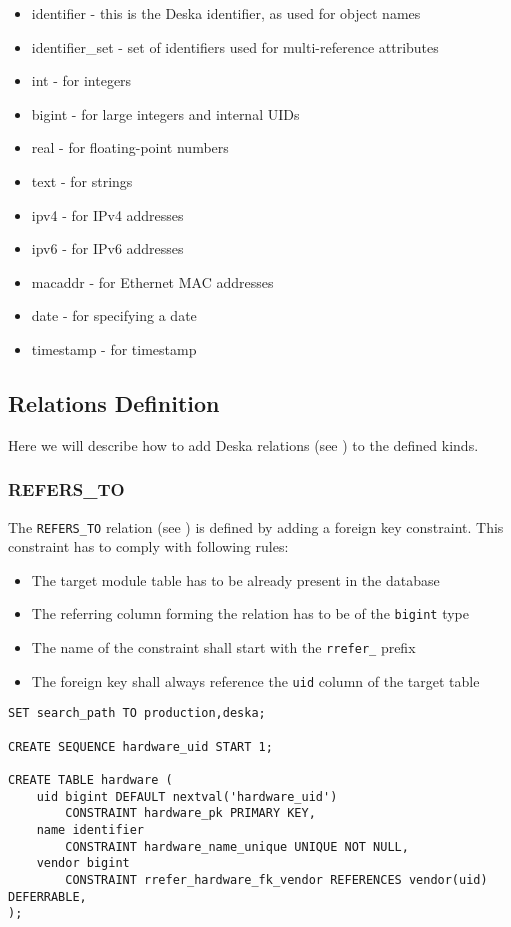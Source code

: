 \documentclass[deska]{subfiles}
\begin{document}
\begin{itemize}
	\item{identifier} - this is the Deska identifier, as used for object names
	\item{identifier\_set} - set of identifiers used for multi-reference attributes
	\item{int} - for integers
	\item{bigint} - for large integers and internal UIDs
	\item{real} - for floating-point numbers
	\item{text} - for strings
	\item{ipv4} - for IPv4 addresses
	\item{ipv6} - for IPv6 addresses
	\item{macaddr} - for Ethernet MAC addresses
	\item{date} - for specifying a date
	\item{timestamp} - for timestamp
\end{itemize}

\subsection{Relations Definition}
Here we will describe how to add Deska relations (see ) to the defined kinds.

\subsubsection{REFERS\_TO}
\label{sec:db-scheme-refers-to}

The {\tt REFERS\_TO} relation (see ) is defined by adding a foreign key constraint. This
constraint has to comply with following rules:

\begin{itemize}
    \item The target module table has to be already present in the database
    \item The referring column forming the relation has to be of the {\tt bigint} type
    \item The name of the constraint shall start with the {\tt rrefer\_} prefix
    \item The foreign key shall always reference the {\tt uid} column of the target table
\end{itemize}

\begin{verbatim}
SET search_path TO production,deska;

CREATE SEQUENCE hardware_uid START 1;

CREATE TABLE hardware (
    uid bigint DEFAULT nextval('hardware_uid')
        CONSTRAINT hardware_pk PRIMARY KEY,
    name identifier
        CONSTRAINT hardware_name_unique UNIQUE NOT NULL,
    vendor bigint 
        CONSTRAINT rrefer_hardware_fk_vendor REFERENCES vendor(uid) DEFERRABLE,
);
\end{verbatim}
\end{document}
